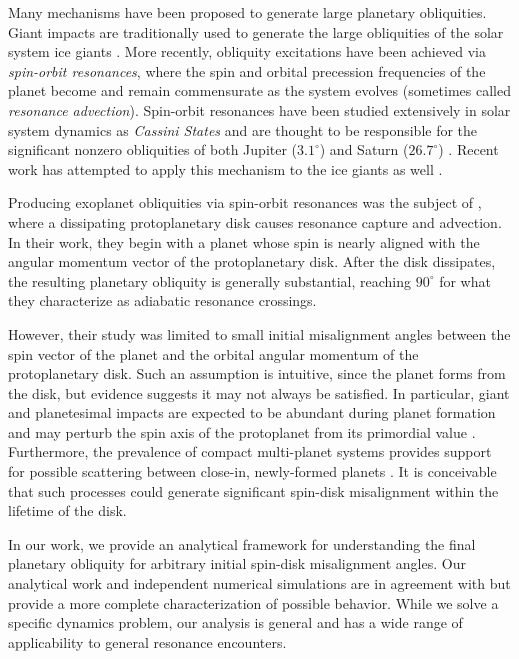 \documentclass[
        fleqn,
        usenatbib,
    ]{mnras}
\begin{document}
Many mechanisms have been proposed to generate large planetary obliquities.
Giant impacts are traditionally used to generate the large obliquities of the
solar system ice giants \citep{original_gi, morbidelli_gi}. More recently,
obliquity excitations have been achieved via \emph{spin-orbit resonances}, where
the spin and orbital precession frequencies of the planet become and remain
commensurate as the system evolves (sometimes called \emph{resonance
advection}). Spin-orbit resonances have been studied extensively in solar system
dynamics as \emph{Cassini States} and are thought to be responsible for the
significant nonzero obliquities of both Jupiter ($3.1^\circ$) and Saturn
($26.7^\circ$) \citep{colombo1966, henrard1987, ward2004I, ward_jupiter}. Recent
work has attempted to apply this mechanism to the ice giants as well
\citep{hamilton_tilting_ice}.

Producing exoplanet obliquities via spin-orbit resonances was the subject of
\citet{millholland_disk}, where a dissipating protoplanetary disk causes
resonance capture and advection. In their work, they begin with a planet whose
spin is nearly aligned with the angular momentum vector of the protoplanetary
disk. After the disk dissipates, the resulting planetary obliquity is generally
substantial, reaching $90^\circ$ for what they characterize as adiabatic
resonance crossings.

However, their study was limited to small initial misalignment angles between
the spin vector of the planet and the orbital angular momentum of the
protoplanetary disk. Such an assumption is intuitive, since the planet forms
from the disk, but evidence suggests it may not always be satisfied. In
particular, giant and planetesimal impacts are expected to be abundant during
planet formation and may perturb the spin axis of the protoplanet from its
primordial value \citep{yalinewich2019atmospheric, schlichting2015atmospheric}.
Furthermore, the prevalence of compact multi-planet systems provides support for
possible scattering between close-in, newly-formed planets \citep{usp_compact1,
usp_review}. It is conceivable that such processes could generate significant
spin-disk misalignment within the lifetime of the disk.

In our work, we provide an analytical framework for understanding the final
planetary obliquity for arbitrary initial spin-disk misalignment angles. Our
analytical work and independent numerical simulations are in agreement with
\citet{millholland_disk} but provide a more complete characterization of
possible behavior. While we solve a specific dynamics problem, our analysis
is general and has a wide range of applicability to general resonance
encounters.
\end{document}
